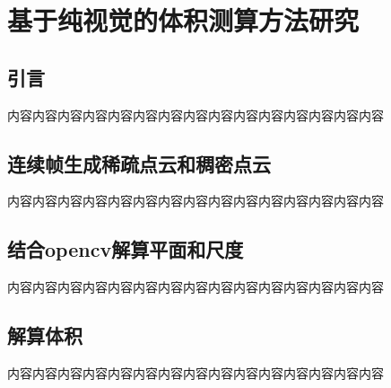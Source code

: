 \chapter{基于纯视觉的体积测算方法研究}
\label{cha:chap3}
\section{引言}
\label{sec:3.1}
内容内容内容内容内容内容内容内容内容内容内容内容内容内容内容
\section{连续帧生成稀疏点云和稠密点云}
\label{sec:3.2}
内容内容内容内容内容内容内容内容内容内容内容内容内容内容内容
\section{结合opencv解算平面和尺度}
\label{sec:3.3}
内容内容内容内容内容内容内容内容内容内容内容内容内容内容内容
\section{解算体积}
\label{sec:3.4}
内容内容内容内容内容内容内容内容内容内容内容内容内容内容内容

